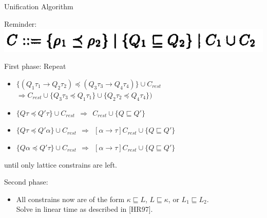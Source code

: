\documentclass{beamer}
\begin{document}
\begin{frame}{Unification Algorithm}

Reminder:\\ \includegraphics[scale=0.55]{paper_constraint_grammar_qualifs.png}

\bigskip

First phase: Repeat
\begin{itemize}
\item $\{(Q_1\tau_1 \rightarrow Q_2\tau_2) \preceq (Q_3\tau_3 \rightarrow Q_4\tau_4)\} \cup C_{rest}$ \\
$\Rightarrow C_{rest} \cup \{Q_3\tau_3 \preceq Q_1\tau_1\} \cup \{ Q_2\tau_2 \preceq Q_4\tau_4\})$
\item $\{Q\tau \preceq Q'\tau\} \cup C_{rest} ~~\Rightarrow~~ C_{rest} \cup \{ Q \sqsubseteq Q'\}$
\item $\{Q\tau \preceq Q'\alpha\} \cup C_{rest} ~~\Rightarrow~~ [\alpha \rightarrow \tau]C_{rest} \cup \{Q \sqsubseteq Q'\}$
\item $\{Q\alpha \preceq Q'\tau\} \cup C_{rest} ~~\Rightarrow~~ [\alpha \rightarrow \tau]C_{rest} \cup \{Q \sqsubseteq Q'\}$
\end{itemize}
until only lattice constrains are left.

Second phase:
\begin{itemize}
\item All constrains now are of the form $\kappa \sqsubseteq L$, $L \sqsubseteq \kappa$, or $L_1 \sqsubseteq L_2$.\\
Solve in linear time as described in [HR97].
\end{itemize}


\end{frame}
\end{document}
